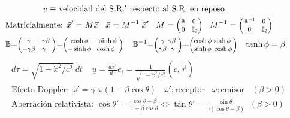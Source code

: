 \begin{align*}
    &\hspace{45pt}
\text{$v\equiv$ velocidad del S.R.$'$ respecto al S.R. en reposo.}\\
    &\text{Matricialmente: }\vec{x}' = M \vec{x} \; \;\; \vec{x}=M^{-1}\;\vec{x}'\; \; \; M=
    \scalebox{0.8}{$    \begin{pmatrix} \mathbb{B} & 0\;\\ 
    0 & \mathbb{I}_2\\ 
   \end{pmatrix}$} \; \; \;
   M^{-1} = \scalebox{0.8}{$    \begin{pmatrix} \mathbb{B}^{-1} & 0\;\\ 
    0 & \mathbb{I}_2\\ 
   \end{pmatrix}$}
   \\
    &\mathbb{B} {=} \scalebox{0.8}{$\begin{pmatrix} \gamma \hspace{-5pt}\!& \!-\gamma \beta \; \\ 
    -\gamma\beta \hspace{-5pt}\!&\! \gamma \\ 
    \end{pmatrix}$}{=}\scalebox{0.8}{$\begin{pmatrix} \cosh \phi \hspace{-7pt}& -\sinh\phi \; \\ 
    -\sinh\phi \hspace{-7pt}& \cosh \phi \\ 
    \end{pmatrix}$}\; \;\;\;  \mathbb{B}^{-1} {=} \scalebox{0.8}{$\begin{pmatrix} \gamma \hspace{-5pt}\!& \!\gamma \beta \; \\ 
    \gamma\beta \hspace{-5pt}\!&\! \gamma \\ 
    \end{pmatrix}$}{=}\scalebox{0.8}{$\begin{pmatrix} \cosh \phi \hspace{-7pt}& \sinh\phi \; \\ 
    \sinh\phi \hspace{-7pt}& \cosh \phi \\ 
    \end{pmatrix}$}\;\;\; \tanh\phi =\beta
\end{align*}
\begin{align*}
    &d\tau  =\sqrt{1-\dot{x}^2/c^2}  \: dt  \;\;\;\;\underline{u} = \frac{dx^i}{d\tau} e_i = \frac{1}{\sqrt{1-\dot{x}^2/c^2 }}(c,\dot{\vec{r}})\\
    &\text{Efecto Doppler: } \omega' = \gamma  \; \omega  (1- \beta \cos \theta)\;\;\; \omega': \text{receptor}\;\;\; \omega: \text{emisor} \; \; \; (\beta >0)\\
    &\text{Aberración relativista: }\cos \theta' = \frac{ \cos \theta- \beta }{1-\beta \cos \theta} \Leftrightarrow \tan\theta' = \frac{\sin \theta }{\gamma (\cos \theta - \beta)}\;\;  (\beta>0)
\end{align*}
